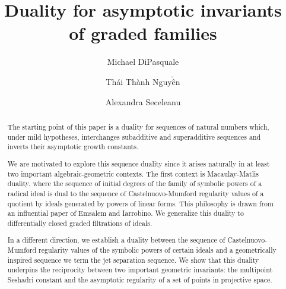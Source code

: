 \documentclass[12pt, reqno]{amsart}
\title[Duality for asymptotic invariants]{Duality for asymptotic invariants \\of graded families}
\author{Michael DiPasquale}
\author{Th\'{a}i Th\`{a}nh Nguy$\tilde{\text{\^e}}$n}
\author{Alexandra Seceleanu}
\numberwithin{equation}{section}
\theoremstyle{plain} %
\theoremstyle{definition}
\theoremstyle{remark}
\begin{document}
\begin{abstract}
The starting point of this paper is a duality for sequences of natural numbers which, %
under mild hypotheses, interchanges subadditive and superadditive sequences and inverts their asymptotic growth constants.

We are motivated to explore this sequence duality since it arises naturally in at least two important algebraic-geometric contexts.  The first context is Macaulay-Matlis duality, where the sequence of initial degrees of the family of symbolic powers of a radical ideal is dual to  the sequence of Castelnuovo-Mumford regularity values of a quotient by ideals generated by powers of linear forms. This philosophy is drawn from an influential paper of Emsalem and Iarrobino. We generalize this duality to differentially closed graded filtrations of ideals.

In a different direction, we establish a duality between the sequence of Castelnuovo-Mumford regularity values of the symbolic powers of certain ideals and a geometrically inspired sequence we term the jet separation sequence. We show that this duality underpins the reciprocity between two important geometric invariants: the multipoint Seshadri constant and the asymptotic regularity of a set of points in projective space.


%
%
%
\end{abstract}
\end{document}
